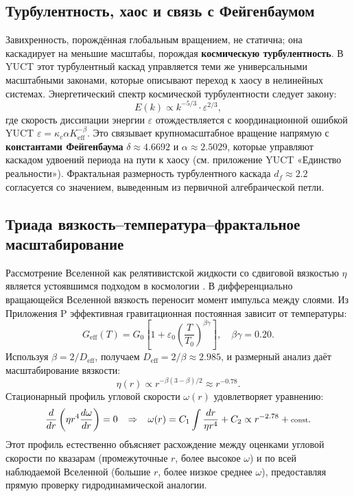 \documentclass[11pt,a4paper]{article}
\begin{document}
	\subsection{Турбулентность, хаос и связь с Фейгенбаумом}
	
	Завихренность, порождённая глобальным вращением, не статична; она каскадирует на меньшие масштабы, порождая \textbf{космическую турбулентность}. В YUCT этот турбулентный каскад управляется теми же универсальными масштабными законами, которые описывают переход к хаосу в нелинейных системах. Энергетический спектр космической турбулентности следует закону:
	\begin{equation}
		E(k) \propto k^{-5/3} \cdot \varepsilon^{2/3},
	\end{equation}
	где скорость диссипации энергии \(\varepsilon\) отождествляется с координационной ошибкой YUCT \(\varepsilon = \kappa_c \alpha K_{\mathrm{eff}}^{-\beta}\). Это связывает крупномасштабное вращение напрямую с \textbf{константами Фейгенбаума} \(\delta \approx 4.6692\) и \(\alpha \approx 2.5029\), которые управляют каскадом удвоений периода на пути к хаосу (см. приложение YUCT «Единство реальности»). Фрактальная размерность турбулентного каскада \(d_f \approx 2.2\) согласуется со значением, выведенным из первичной алгебраической петли.
	
	\subsection{Триада вязкость–температура–фрактальное масштабирование}
	
	Рассмотрение Вселенной как релятивистской жидкости со сдвиговой вязкостью \(\eta\) является устоявшимся подходом в космологии \cite{Giovannini2005}. В дифференциально вращающейся Вселенной вязкость переносит момент импульса между слоями. Из Приложения P эффективная гравитационная постоянная зависит от температуры:
	\begin{equation}
		G_{\mathrm{eff}}(T) = G_0\left[1 + \varepsilon_0\left(\frac{T}{T_0}\right)^{\beta\gamma}\right], \quad \beta\gamma = 0.20.
	\end{equation}
	Используя \(\beta = 2/D_{\mathrm{eff}}\), получаем \(D_{\mathrm{eff}} = 2/\beta \approx 2.985\), и размерный анализ даёт масштабирование вязкости:
	\begin{equation}
		\eta(r) \propto r^{-\beta(3-\beta)/2} \approx r^{-0.78}.
	\end{equation}
	Стационарный профиль угловой скорости \(\omega(r)\) удовлетворяет уравнению:
	\begin{equation}
		\scriptsize
		\frac{d}{dr}\left( \eta r^4 \frac{d\omega}{dr} \right) = 0 \quad \Rightarrow \quad \omega(r) = C_1 \int \frac{dr}{\eta r^4} + C_2 \propto r^{-2.78} + \text{const}.
	\end{equation}
	Этот профиль естественно объясняет расхождение между оценками угловой скорости по квазарам (промежуточные \(r\), более высокое \(\omega\)) и по всей наблюдаемой Вселенной (большие \(r\), более низкое среднее \(\omega\)), предоставляя прямую проверку гидродинамической аналогии.
	
\end{document}

